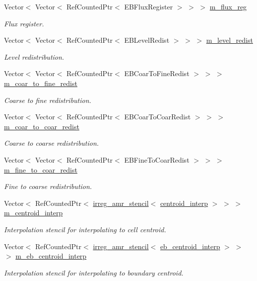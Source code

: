 \begin{DoxyCompactItemize}
Vector$<$ Vector$<$ Ref\+Counted\+Ptr$<$ E\+B\+Flux\+Register $>$ $>$ $>$ \hyperlink{classamr__mesh_a5d61b708ca98849c2dbbddea33cc3808}{m\+\_\+flux\+\_\+reg}
\begin{DoxyCompactList}\small\item\em Flux register. \end{DoxyCompactList}\item 
Vector$<$ Vector$<$ Ref\+Counted\+Ptr$<$ E\+B\+Level\+Redist $>$ $>$ $>$ \hyperlink{classamr__mesh_ac78f1491d15e3584cdd624e5b0424e50}{m\+\_\+level\+\_\+redist}
\begin{DoxyCompactList}\small\item\em Level redistribution. \end{DoxyCompactList}\item 
Vector$<$ Vector$<$ Ref\+Counted\+Ptr$<$ E\+B\+Coar\+To\+Fine\+Redist $>$ $>$ $>$ \hyperlink{classamr__mesh_a195b44857b684c2273d3179a484e794f}{m\+\_\+coar\+\_\+to\+\_\+fine\+\_\+redist}
\begin{DoxyCompactList}\small\item\em Coarse to fine redistribution. \end{DoxyCompactList}\item 
Vector$<$ Vector$<$ Ref\+Counted\+Ptr$<$ E\+B\+Coar\+To\+Coar\+Redist $>$ $>$ $>$ \hyperlink{classamr__mesh_ae0949596c227cf6fd0259730997d6cf8}{m\+\_\+coar\+\_\+to\+\_\+coar\+\_\+redist}
\begin{DoxyCompactList}\small\item\em Coarse to coarse redistribution. \end{DoxyCompactList}\item 
Vector$<$ Vector$<$ Ref\+Counted\+Ptr$<$ E\+B\+Fine\+To\+Coar\+Redist $>$ $>$ $>$ \hyperlink{classamr__mesh_a5849a56a0af6335296c0c4e32a3006d5}{m\+\_\+fine\+\_\+to\+\_\+coar\+\_\+redist}
\begin{DoxyCompactList}\small\item\em Fine to coarse redistribution. \end{DoxyCompactList}\item 
Vector$<$ Ref\+Counted\+Ptr$<$ \hyperlink{classirreg__amr__stencil}{irreg\+\_\+amr\+\_\+stencil}$<$ \hyperlink{classcentroid__interp}{centroid\+\_\+interp} $>$ $>$ $>$ \hyperlink{classamr__mesh_a24f677a3c567b7f4464a760a8c51ae92}{m\+\_\+centroid\+\_\+interp}
\begin{DoxyCompactList}\small\item\em Interpolation stencil for interpolating to cell centroid. \end{DoxyCompactList}\item 
Vector$<$ Ref\+Counted\+Ptr$<$ \hyperlink{classirreg__amr__stencil}{irreg\+\_\+amr\+\_\+stencil}$<$ \hyperlink{classeb__centroid__interp}{eb\+\_\+centroid\+\_\+interp} $>$ $>$ $>$ \hyperlink{classamr__mesh_a09e8d1b645ad96a3d97f0304c3f55ad3}{m\+\_\+eb\+\_\+centroid\+\_\+interp}
\begin{DoxyCompactList}\small\item\em Interpolation stencil for interpolating to boundary centroid. \end{DoxyCompactList}\end{DoxyCompactItemize}


